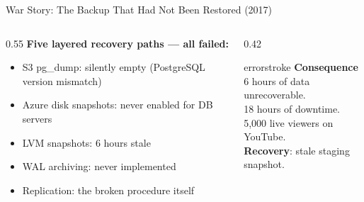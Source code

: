 \documentclass[aspectratio=169, 12pt]{beamer}
\begin{document}
\begin{frame}{War Story: The Backup That Had Not Been Restored (2017)}
\begin{columns}[T]
\begin{column}{0.55\textwidth}
    \vspace{0.1cm}
    \textbf{Five layered recovery paths --- all failed:}
    {\footnotesize
    \begin{itemize}\setlength\itemsep{0pt}
      \item S3 pg\_dump: silently empty (PostgreSQL version mismatch)
      \item Azure disk snapshots: never enabled for DB servers
      \item LVM snapshots: 6 hours stale
      \item WAL archiving: never implemented
      \item Replication: the broken procedure itself
    \end{itemize}
    }
  \end{column}
  \begin{column}{0.42\textwidth}
    \vspace{0.1cm}
    \begin{mlsyscard}{errorstroke}
    \textbf{Consequence}\\[0.05cm]
    {\footnotesize 6 hours of data unrecoverable.\\
    18 hours of downtime.\\
    5,000 live viewers on YouTube.\\[0.1cm]
    \textbf{Recovery}: stale staging snapshot.}
    \end{mlsyscard}

    \vspace{0.15cm}
  \end{column}
\end{columns}

\end{frame}
\end{document}
